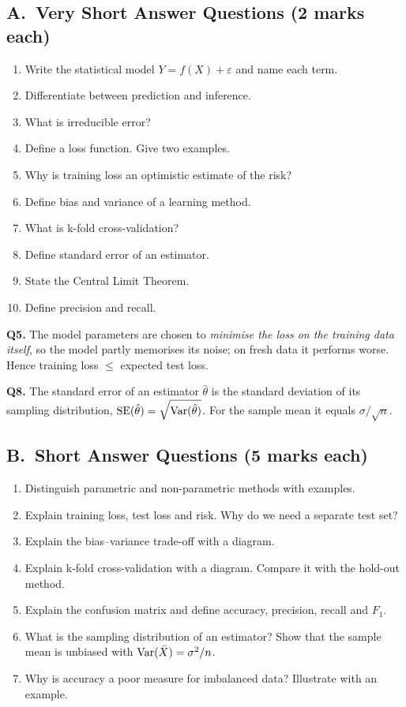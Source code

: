 \subsection*{A.\ Very Short Answer Questions (2 marks each)}
\begin{enumerate}
  \item Write the statistical model $Y=f(X)+\varepsilon$ and name each term. 
  \item Differentiate between prediction and inference. 
  \item What is irreducible error? 
  \item Define a loss function. Give two examples. 
  \item Why is training loss an optimistic estimate of the risk? 
  \item Define bias and variance of a learning method. 
  \item What is k-fold cross-validation? 
  \item Define standard error of an estimator. 
  \item State the Central Limit Theorem. 
  \item Define precision and recall. 
\end{enumerate}

\begin{modelans}[: Q5 and Q8]
\textbf{Q5.} The model parameters are chosen to \emph{minimise the loss on the training data itself}, so the model partly memorises its noise; on fresh data it performs worse. Hence training loss $\le$ expected test loss.\par
\textbf{Q8.} The standard error of an estimator $\hat\theta$ is the standard deviation of its sampling distribution, $\operatorname{SE}(\hat\theta)=\sqrt{\operatorname{Var}(\hat\theta)}$. For the sample mean it equals $\sigma/\sqrt n$.
\end{modelans}

\subsection*{B.\ Short Answer Questions (5 marks each)}
\begin{enumerate}
  \item Distinguish parametric and non-parametric methods with examples. 
  \item Explain training loss, test loss and risk. Why do we need a separate test set? 
  \item Explain the bias--variance trade-off with a diagram. 
  \item Explain k-fold cross-validation with a diagram. Compare it with the hold-out method. 
  \item Explain the confusion matrix and define accuracy, precision, recall and $F_1$. 
  \item What is the sampling distribution of an estimator? Show that the sample mean is unbiased with $\operatorname{Var}(\bar X)=\sigma^2/n$. 
  \item Why is accuracy a poor measure for imbalanced data? Illustrate with an example. 
\end{enumerate}

